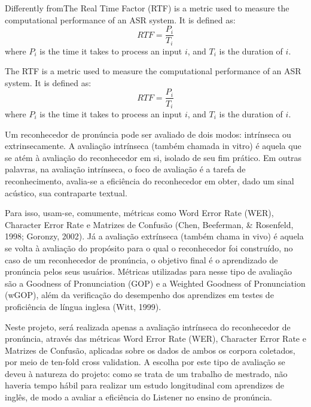 Differently fromThe Real Time Factor (\ac{RTF}) is a metric used to measure the computational performance of 
an \ac{ASR} system. It is defined as:
\begin{equation}
 \textit{RTF}=\frac{P_i}{T_i}
\end{equation}
where $P_i$ is the time it takes to process an input $i$, and $T_i$ is the duration of $i$.

The \ac{RTF} is a metric used to measure the computational performance of 
an \ac{ASR} system. It is defined as:
\begin{equation}
 \textit{RTF}=\frac{P_i}{T_i}
\end{equation}
where $P_i$ is the time it takes to process an input $i$, and $T_i$ is the duration of $i$.


Um reconhecedor de pron\'uncia pode ser avaliado de dois modos: intr\'inseca
ou extrinsecamente. A avalia\c{c}\~ao intr\'inseca (tamb\'em chamada in vitro) \'e
aquela que se at\'em à avalia\c{c}\~ao do reconhecedor em si, isolado de seu fim
pr\'atico. Em outras palavras, na avalia\c{c}\~ao intr\'inseca, o foco de
avalia\c{c}\~ao \'e a tarefa de reconhecimento, avalia-se a efici\^encia do
reconhecedor em obter, dado um sinal ac\'ustico, sua contraparte textual.

Para isso, usam-se, comumente, m\'etricas como Word Error Rate (WER),
Character Error Rate e Matrizes de Confus\~ao (Chen, Beeferman, \&
Rosenfeld, 1998; Goronzy, 2002). J\'a a avalia\c{c}\~ao extr\'inseca (tamb\'em chama
in vivo) \'e aquela se volta à avalia\c{c}\~ao do prop\'osito para o qual o
reconhecedor foi constru\'ido, no caso de um reconhecedor de pron\'uncia, o
objetivo final \'e o aprendizado de pron\'uncia pelos seus usu\'arios.
M\'etricas utilizadas para nesse tipo de avalia\c{c}\~ao s\~ao a Goodness of
Pronunciation (GOP) e a Weighted Goodness of Pronunciation (wGOP), al\'em
da verifica\c{c}\~ao do desempenho dos aprendizes em testes de profici\^encia de
l\'ingua inglesa (Witt, 1999).

Neste projeto, ser\'a realizada apenas a avalia\c{c}\~ao intr\'inseca do
reconhecedor de pron\'uncia, atrav\'es das m\'etricas Word Error Rate (WER),
Character Error Rate e Matrizes de Confus\~ao, aplicadas sobre os dados de
ambos os corpora coletados, por meio de ten-fold cross validation. A
escolha por este tipo de avalia\c{c}\~ao se deveu à natureza do projeto: como
se trata de um trabalho de mestrado, n\~ao haveria tempo h\'abil para
realizar um estudo longitudinal com aprendizes de ingl\^es, de modo a
avaliar a efici\^encia do Listener no ensino de pron\'uncia.

